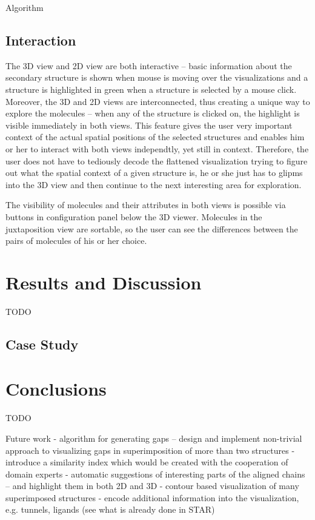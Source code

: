 \documentclass[twocolumn]{bmcart}%
\begin{document}
Algorithm

\subsection*{Interaction}

The 3D view and 2D view are both interactive -- basic information about the secondary structure is shown when mouse is moving over the visualizations and a structure is highlighted in green when a structure is selected by a mouse click. Moreover, the 3D and 2D views are interconnected, thus creating a unique way to explore the molecules -- when any of the structure is clicked on, the highlight is visible immediately in both views. This feature gives the user very important context of the actual spatial positions of the selected structures and enables him or her to interact with both views independtly, yet still in context. Therefore, the user does not have to tediously decode the flattened visualization trying to figure out what the spatial context of a given structure is, he or she just has to glipms into the 3D view and then continue to the next interesting area for exploration.

The visibility of molecules and their attributes in both views is possible via buttons in configuration panel below the 3D viewer. Molecules in the juxtaposition view are sortable, so the user can see the differences between the pairs of molecules of his or her choice.



\section*{Results and Discussion}
TODO

\subsection*{Case Study}

\section*{Conclusions}
TODO

Future work
- algorithm for generating gaps -- design and implement non-trivial approach to visualizing gaps in superimposition of more than two structures
- introduce a similarity index which would be created with the cooperation of domain experts
- automatic suggestions of interesting parts of the aligned chains -- and highlight them in both 2D and 3D
- contour based visualization of many superimposed structures
- encode additional information into the visualization, e.g. tunnels, ligands (see what is already done in STAR)
\end{document}
